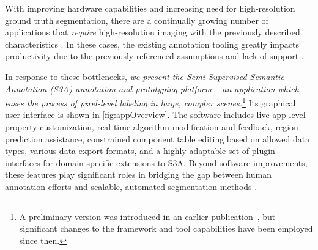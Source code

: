 With improving hardware capabilities and increasing need for high-resolution ground truth segmentation, there are a continually growing number of applications that \emph{require} high-resolution imaging with the previously described characteristics \cite{Mohajerani_cloudRemoteSensing,Demochkina_improvingOneShotXray}.
In these cases, the existing annotation tooling greatly impacts productivity due to the previously referenced assumptions and lack of support \cite{SpaceNet2020-lb}.

In response to these bottlenecks, \emph{we present the Semi-Supervised Semantic Annotation (S3A) annotation and prototyping platform -- an application which eases the process of pixel-level labeling in large, complex scenes.}\footnote{A preliminary version was introduced in an earlier publication~\cite{jessurunComponentDetectionEvaluation2020}, but significant changes to the framework and tool capabilities have been employed since then.}
Its graphical user interface is shown in \autoref{fig:appOverview}.
The software includes live app-level property customization, real-time algorithm modification and feedback, region prediction assistance, constrained component table editing based on allowed data types, various data export formats, and a highly adaptable set of plugin interfaces for domain-specific extensions to S3A.
Beyond software improvements, these features play significant roles in bridging the gap between human annotation efforts and scalable, automated segmentation methods \cite{Branson_humansInLoop}.

\makeAppOverviewFig
